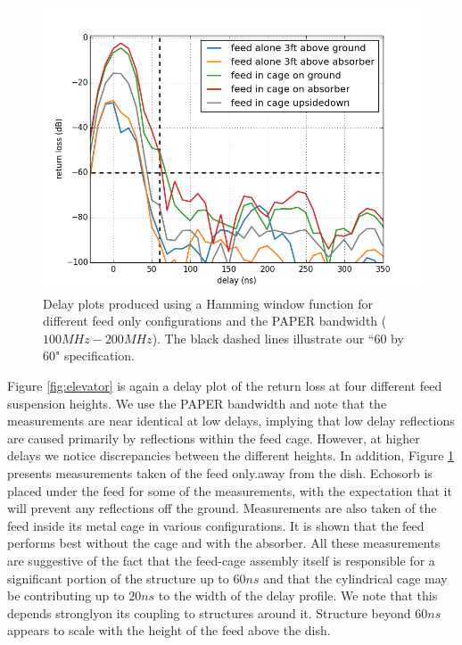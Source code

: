 \documentclass[iop]{emulateapj}
\begin{document}
\begin{figure}[H]
\centering
\includegraphics[width=\linewidth]{plots/delay_feed.png}
\caption{Delay plots produced using a Hamming window function for different feed only configurations and the PAPER bandwidth ($100MHz-200MHz$). The black dashed lines illustrate our ``60 by 60" specification.}
\label{fig:outofthedish}
\end{figure}

Figure \ref{fig:elevator} is again a delay plot of the return loss at four different feed suspension heights. 
We use the PAPER bandwidth and note
that the measurements are near identical at low delays, implying that low delay reflections are caused primarily by reflections within the feed cage. 
However, at higher delays we notice discrepancies between the different heights.
In addition, Figure \ref{fig:outofthedish} presents measurements taken of the feed only.away from the dish. Echosorb is placed under the feed for some of the
measurements, with the expectation that it will prevent any reflections off the
ground.
 Measurements are also taken of the feed inside its metal cage in various configurations. It is shown that the feed performs best without the cage and with the absorber. 
All these measurements are suggestive of the  fact that the feed-cage assembly itself is responsible for a significant portion of the structure up to $60ns$ and
that the cylindrical cage may be contributing up to $20ns$ to the width of the delay profile. 
We note that this depends stronglyon its coupling to structures around it. 
Structure beyond $60ns$ appears to scale with the height of the feed above the dish.
\end{document}
